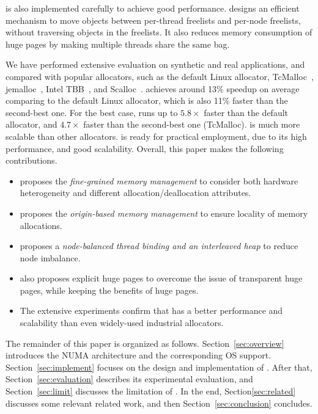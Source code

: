 \NM{} is also implemented carefully to achieve good performance. \NM{} designs an efficient mechanism to move objects between per-thread freelists and per-node freelists, without traversing objects in the freelists. It also reduces memory consumption of huge pages by making multiple threads share the same bag. 

We have performed extensive evaluation on synthetic and real applications, and compared \NM{} with popular allocators, such as the default Linux allocator, TcMalloc~\cite{tcmalloc}, jemalloc~\cite{jemalloc}, Intel TBB~\cite{tbb}, and Scalloc~\cite{Scalloc}. \NM{} achieves around 13\% speedup on average comparing to the default Linux allocator, which is also 11\% faster than the second-best one. For the best case, \NM{} runs up to $5.8\times$ faster than the default allocator, and $4.7\times$ faster than the second-best one (TcMalloc). \NM{} is much more scalable than other allocators. \NM{} is ready for practical employment, due to its high performance, and good scalability. Overall, this paper makes the following contributions. 

\begin{itemize}

\item \NM{} proposes the \textit{fine-grained memory management} to consider both hardware heterogeneity and different allocation/deallocation attributes.

\item \NM{} proposes the \textit{origin-based memory management} to ensure locality of memory allocations.  

\item \NM{} proposes a \textit{node-balanced thread binding and an interleaved heap} to reduce node imbalance. 

\item \NM{} also proposes explicit huge pages to overcome the issue of transparent huge pages, while keeping the benefits of huge pages. 

\item The extensive experiments confirm that \NM{} has a better performance and scalability than even widely-used industrial allocators. 

\end{itemize}

The remainder of this paper is organized as follows. Section~\ref{sec:overview} introduces the NUMA architecture and the corresponding OS support. Section~\ref{sec:implement} focuses on the design and implementation of \NM{}. After that, Section~\ref{sec:evaluation} describes its experimental evaluation, and Section~\ref{sec:limit} discusses the limitation of \NM{}. In the end, Section\ref{sec:related} discusses some relevant related work, and then Section~\ref{sec:conclusion} concludes. 

